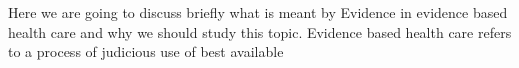 Here we are going to discuss briefly what is meant by Evidence in evidence based health care and why we should study this topic. Evidence based health care refers to a process of judicious use of best available 
